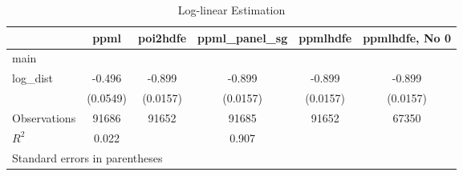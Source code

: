 \begin{table}[htbp]\centering
\caption{Log-linear Estimation}
\begin{tabular}{l*{5}{c}}
\hline\hline
                    &\multicolumn{1}{c}{ppml}&\multicolumn{1}{c}{poi2hdfe}&\multicolumn{1}{c}{ppml\_panel\_sg}&\multicolumn{1}{c}{ppmlhdfe}&\multicolumn{1}{c}{ppmlhdfe, No 0}\\
\hline
main                &            &            &            &            &            \\
log\_dist            &      -0.496&      -0.899&      -0.899&      -0.899&      -0.899\\
                    &    (0.0549)&    (0.0157)&    (0.0157)&    (0.0157)&    (0.0157)\\
\hline
Observations        &       91686&       91652&       91685&       91652&       67350\\
\(R^{2}\)           &       0.022&            &       0.907&            &            \\
\hline\hline
\multicolumn{6}{l}{\footnotesize Standard errors in parentheses}\\
\end{tabular}
\end{table}
